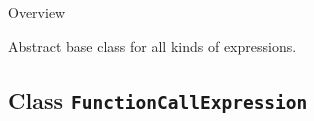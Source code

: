	\begin{longdescription}
		\item[Overview] 		
				

	

		Abstract base class for all kinds of expressions.		
		
	
	
	\end{longdescription}
	

\subsection{Class \bfseries \texttt{FunctionCallExpression}\normalfont}
\label{cls:uppaal::expressions::FunctionCallExpression} 
	
